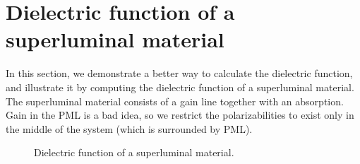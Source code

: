 \section{Dielectric function of a superluminal material}

\begin{comment}
#include <stdio.h>
#include <stdlib.h>
#include <signal.h>

#include "dactyl.h"

const int rad = 10;
const int m = 0;
const double eps_value = 2.25;
const double fmin = 0.05;

const double pml = 1.0;
const int npml = (int)(0.5+pml*rad);
const double zsize = 2*pml+10/(double)rad;//+1.0/freq;
const double rmax  = 6/(double)rad;
const double zmiddle = zsize/2;
const double sourceloc = zmiddle - 4/(double)rad;

const double r_look = 1.5/rad, z_look = zmiddle, d = 1.0/rad;

complex<double> source_sharp(double r) {
  double sig = 1.0/rad;
  double dr = r - rmax*.5;
  if (fabs(r) >= rmax) return 0.0;
  return exp(-dr*dr/(2*sig*sig))/sqrt(sig);
}
double eps(double r, double z) { return eps_value; }
double one_in_middle(double r, double z) {
  const double midmax = r_look+2.0/(double)rad;
  const double midwid = 2/(double)rad;
  if (r <= midmax && z >= zmiddle-midwid && z < zmiddle+midwid) {
    return 1;
  } else {
    return 0;
  }
}

int main(int argc, char **argv) {
  deal_with_ctrl_c();
  const char *dirname = make_output_directory(argv[0]);
  printf("Using pml of %
  printf("Using an rmax of %
  mat ma(eps, rmax + pml, zsize, rad);
  printf("I expect %
  ma.set_output_directory(dirname);
\end{comment}

In this section, we demonstrate a better way to calculate the dielectric
function, and illustrate it by computing the dielectric function of a
superluminal material.  The superluminal material consists of a gain line
together with an absorption.  Gain in the PML is a bad idea, so we restrict
the polarizabilities to exist only in the middle of the system (which is
surrounded by PML).

\begin{figure}
\label{superluminal_epsilon}
\caption{Dielectric function of a superluminal material.}
\end{figure}

